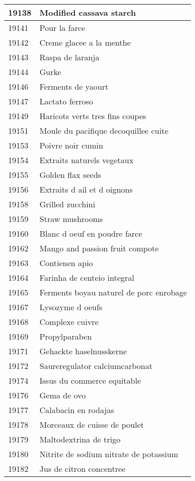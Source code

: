 \begin{longtable}{|l|l|}
19138 & Modified cassava starch \\ \hline 
19141 & Pour la farce \\ \hline 
19142 & Creme glacee a la menthe \\ \hline 
19143 & Raspa de laranja \\ \hline 
19144 & Gurke \\ \hline 
19146 & Ferments de yaourt \\ \hline 
19147 & Lactato ferroso \\ \hline 
19149 & Haricots verts tres fins coupes \\ \hline 
19151 & Moule du pacifique decoquillee cuite \\ \hline 
19153 & Poivre noir cumin \\ \hline 
19154 & Extraits naturels vegetaux \\ \hline 
19155 & Golden flax seeds \\ \hline 
19156 & Extraits d ail et d oignons \\ \hline 
19158 & Grilled zucchini \\ \hline 
19159 & Straw mushrooms \\ \hline 
19160 & Blanc d oeuf en poudre farce \\ \hline 
19162 & Mango and passion fruit compote \\ \hline 
19163 & Contienen apio \\ \hline 
19164 & Farinha de centeio integral \\ \hline 
19165 & Ferments boyau naturel de porc enrobage \\ \hline 
19167 & Lysozyme d oeufs \\ \hline 
19168 & Complexe cuivre \\ \hline 
19169 & Propylparaben \\ \hline 
19171 & Gehackte haselnusskerne \\ \hline 
19172 & Saureregulator calciumcarbonat \\ \hline 
19174 & Issus du commerce equitable \\ \hline 
19176 & Gema de ovo \\ \hline 
19177 & Calabacin en rodajas \\ \hline 
19178 & Morceaux de cuisse de poulet \\ \hline 
19179 & Maltodextrina de trigo \\ \hline 
19180 & Nitrite de sodium nitrate de potassium \\ \hline 
19182 & Jus de citron concentree \\ \hline 

\end{longtable}
